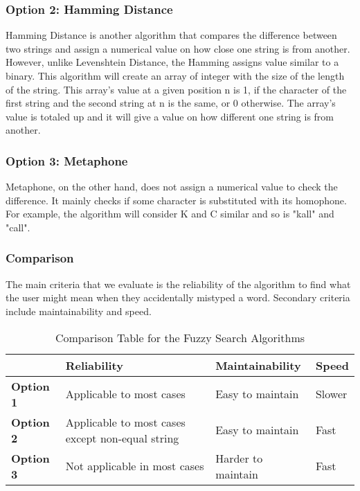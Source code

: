 \documentclass[journal,compsoc, 10pt, draftclsnofoot, onecolumn]{IEEEtran}
\begin{document}
\subsubsection*{Option 2: Hamming Distance}
Hamming Distance is another algorithm that compares the difference between two
strings and assign a numerical value on how close one string is from another.
However, unlike Levenshtein Distance, the Hamming assigns value similar to a binary.
This algorithm will create an array of integer with the size of the length of the
string. This array's value at a given position n is 1, if the character of the first
string and the second string at n is the same, or 0 otherwise. The array's value is
totaled up and it will give a value on how different one string is from another.

\subsubsection*{Option 3: Metaphone}
Metaphone, on the other hand, does not assign a numerical value to check the
difference. It mainly checks if some character is substituted with its homophone. For
example, the algorithm will consider K and C similar and so is "kall" and "call".

\subsubsection{Comparison}
The main criteria that we evaluate is the reliability of the algorithm to find what
the user might mean when they accidentally mistyped a word. Secondary criteria
include maintainability and speed.

\begin{table}[h]
	\centering
	\caption{Comparison Table for the Fuzzy Search Algorithms}
	\label{Comparison Table for the Fuzzy Search Algorithms}
	\begin{tabularx}{\textwidth}{|l|l|l|X|}
		\hline
\textbf{} & \textbf{Reliability} & \textbf{Maintainability} & \textbf{Speed}
		\\ \hline
		\textbf{Option 1} & Applicable to most cases & Easy to maintain & Slower
		\\ \hline
\textbf{Option 2} & Applicable to most cases except non-equal string & Easy to
maintain & Fast
		\\ \hline
\textbf{Option 3} & Not applicable in most cases & Harder to maintain & Fast		\\ \hline
	\end{tabularx}
\end{table}
\end{document}
